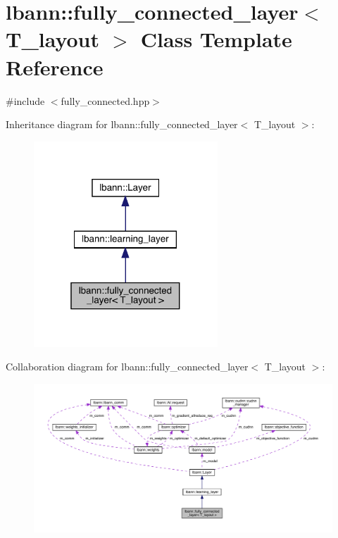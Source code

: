 \hypertarget{classlbann_1_1fully__connected__layer}{}\section{lbann\+:\+:fully\+\_\+connected\+\_\+layer$<$ T\+\_\+layout $>$ Class Template Reference}
\label{classlbann_1_1fully__connected__layer}


{\ttfamily \#include $<$fully\+\_\+connected.\+hpp$>$}



Inheritance diagram for lbann\+:\+:fully\+\_\+connected\+\_\+layer$<$ T\+\_\+layout $>$\+:\nopagebreak
\begin{figure}[H]
\begin{center}
\leavevmode
\includegraphics[width=196pt]{classlbann_1_1fully__connected__layer__inherit__graph}
\end{center}
\end{figure}


Collaboration diagram for lbann\+:\+:fully\+\_\+connected\+\_\+layer$<$ T\+\_\+layout $>$\+:\nopagebreak
\begin{figure}[H]
\begin{center}
\leavevmode
\includegraphics[width=350pt]{classlbann_1_1fully__connected__layer__coll__graph}
\end{center}
\end{figure}
